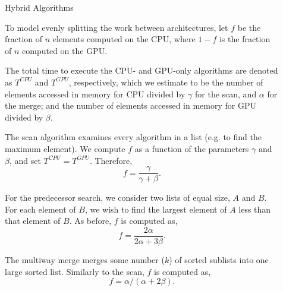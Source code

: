 \documentclass[final]{beamer}
\newlength{\sepwidth}
\newlength{\colwidth}
\newcommand{\separatorcolumn}{\begin{column}{\sepwidth}\end{column}}
\begin{document}
\begin{frame}[t]
\begin{columns}[t]
\begin{column}{\colwidth}
\begin{block}{Hybrid Algorithms}
\begin{description}[font=$\bullet$~\normalfont\scshape\color{red!50!black}]

\item To model evenly splitting the work between architectures, let $f$ be the fraction of $n$ elements computed on the CPU, where $1-f$ is the fraction of $n$ computed on the GPU.

\item The total time to execute the CPU- and GPU-only algorithms are denoted as $T^{CPU}$ and $T^{GPU}$, respectively,
  which we estimate to be the number of elements accessed in memory for CPU divided by $\gamma$ for the scan,
  and $\alpha$ for the merge; and the number of elements accessed in memory for GPU divided by $\beta$.

\end{description}

The scan algorithm examines every algorithm in a list (e.g. to find the maximum element).
We compute $f$ as a function of the parameters $\gamma$ and $\beta$, and set $T^{CPU}=T^{GPU}$. Therefore,
\begin{equation}f=\frac{\gamma}{\gamma+\beta}.\label{eqn:scan_split}\end{equation}


   For the predecessor search, we consider two lists of equal size, $A$ and $B$. For each element of $B$, we wish to find the largest element of $A$
   less than that element of $B$.
   As before, $f$ is computed as,
\begin{equation}f=\frac{2\alpha}{2\alpha+3\beta}.\label{eqn:batch_predecessor_split}\end{equation}

The multiway merge merges some number ($k$) of sorted sublists into one large sorted list.
Similarly to the scan, $f$ is computed as,
\begin{equation}f=\alpha/(\alpha+2\beta)\label{eqn:multiway_split}.\end{equation}

  \end{block}

\end{column}

\separatorcolumn

\begin{column}{\colwidth}


\end{column}
\end{columns}
\end{frame}
\end{document}
